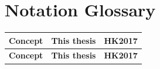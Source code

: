 %
%
\section{Notation Glossary}\label{app:notation}



\begin{longtable}{p{5.3cm} p{3.4cm} p{3.4cm}}
\toprule
\textbf{Concept} & \textbf{This thesis} & \textbf{HK2017} \\
\midrule
\endfirsthead
\midrule
\textbf{Concept} & \textbf{This thesis} & \textbf{HK2017} \\
\midrule
\endhead


\end{longtable}

